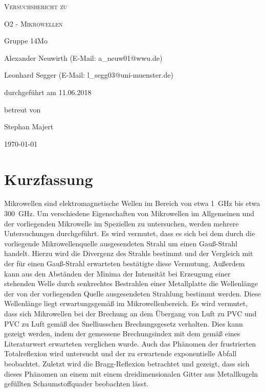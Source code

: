 \documentclass[
	a4paper,
	12pt,
	pagesize,
	ngerman
]{scrartcl}
\begin{document}
	
	\begin{titlepage}
		\centering
		{\scshape\LARGE Versuchsbericht zu \par}
		\vspace{1cm}
		{\scshape\huge O2 - Mikrowellen \par}
		\vspace{2.5cm}
		{\LARGE Gruppe 14Mo \par}
		\vspace{0.5cm}
		
		{\large Alexander Neuwirth (E-Mail: a\_neuw01@wwu.de) \par}
		{\large Leonhard Segger (E-Mail: l\_segg03@uni-muenster.de) \par}
		\vfill
		
		durchgeführt am 11.06.2018\par
		betreut von\par
		{\large Stephan Majert}
		
		\vfill
		
		{\large \today\par}
	\end{titlepage}
	\tableofcontents
	\newpage


	\section{Kurzfassung}
	Mikrowellen sind elektromagnetische Wellen im Bereich von etwa \SI{1}{\giga \Hz} bis etwa \SI{300}{\giga \hertz}.
	Um verschiedene Eigenschaften von Mikrowellen im Allgemeinen und der vorliegenden Mikrowelle im Speziellen zu untersuchen, werden mehrere Untersuchungen durchgeführt.
	Es wird vermutet, dass es sich bei dem durch die vorliegende Mikrowellenquelle ausgesendeten Strahl um einen Gauß-Strahl handelt.
	Hierzu wird die Divergenz des Strahls bestimmt und der Vergleich mit der für einen Gauß-Strahl erwarteten bestätigte diese Vermutung.
	Außerdem kann aus den Abständen der Minima der Intensität bei Erzeugung einer stehenden Welle durch senkrechtes Bestrahlen einer Metallplatte die Wellenlänge der von der vorliegenden Quelle ausgesendeten Strahlung bestimmt werden.
	Diese Wellenlänge liegt erwartungsgemäß im Mikrowellenbereich.
	Es wird vermutet, dass sich Mikrowellen bei der Brechung an dem Übergang von Luft zu PVC und PVC zu Luft gemäß des Snelliusschen Brechungsgesetz verhalten.
	Dies kann gezeigt werden, indem der gemessene Brechungsindex mit dem gemäß eines Literaturwert erwarteten verglichen wurde.
	Auch das Phänomen der frustrierten Totalreflexion wird untersucht und der zu erwartende exponentielle Abfall beobachtet.
	Zuletzt wird die Bragg-Reflexion betrachtet und gezeigt, dass sich dieses Phänomen an einem mit einem dreidimensionalen Gitter aus Metallkugeln gefüllten Schaumstoffquader beobachten lässt.
	
\end{document}
